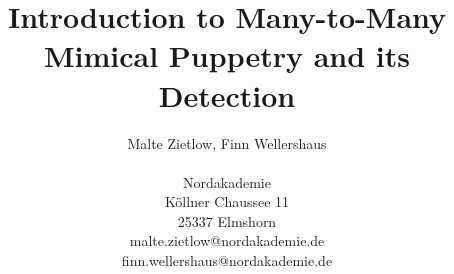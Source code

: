\documentclass{akdai}
\author{
	Malte Zietlow, Finn Wellershaus \\ 
	\\
	Nordakademie\\ 
	Köllner Chaussee 11\\ 
	25337 Elmshorn \\ 
	malte.zietlow@nordakademie.de \\
	finn.wellershaus@nordakademie.de
}
\theoremstyle{definition}
\begin{document}
\title{Introduction to Many-to-Many Mimical Puppetry and its Detection}
\maketitle

\listoftodos{}            %










{\hypersetup{hidelinks}
    \printbibliography{}
    \printglossaries{}
    \listoffigures
    \listoftables
}

\end{document}
